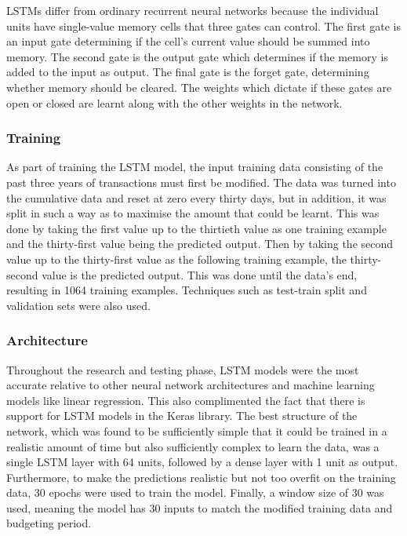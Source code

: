 LSTMs differ from ordinary recurrent neural networks because the individual units have single-value memory cells that three gates can control. The first gate is an input gate determining if the cell's current value should be summed into memory. The second gate is the output gate which determines if the memory is added to the input as output. The final gate is the forget gate, determining whether memory should be cleared. The weights which dictate if these gates are open or closed are learnt along with the other weights in the network.

\subsubsection{Training}
As part of training the LSTM model, the input training data consisting of the past three years of transactions must first be modified. The data was turned into the cumulative data and reset at zero every thirty days, but in addition, it was split in such a way as to maximise the amount that could be learnt. This was done by taking the first value up to the thirtieth value as one training example and the thirty-first value being the predicted output. Then by taking the second value up to the thirty-first value as the following training example, the thirty-second value is the predicted output. This was done until the data's end, resulting in 1064 training examples. Techniques such as test-train split and validation sets were also used.


\subsubsection{Architecture}
Throughout the research and testing phase, LSTM models were the most accurate relative to other neural network architectures and machine learning models like linear regression. This also complimented the fact that there is support for LSTM models in the Keras library. The best structure of the network, which was found to be sufficiently simple that it could be trained in a realistic amount of time but also sufficiently complex to learn the data, was a single LSTM layer with 64 units, followed by a dense layer with 1 unit as output. Furthermore, to make the predictions realistic but not too overfit on the training data, 30 epochs were used to train the model. Finally, a window size of 30 was used, meaning the model has 30 inputs to match the modified training data and budgeting period.

